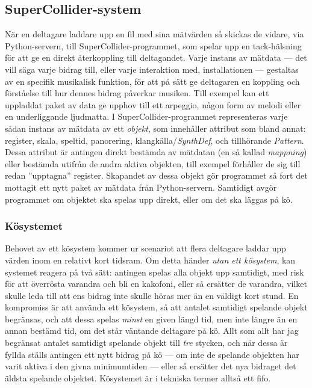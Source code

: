 \documentclass[11pt, a4paper]{article} %
\begin{document}
\subsection*{SuperCollider-system}
När en deltagare laddare upp en fil med sina mätvärden så skickas de vidare, via Python-servern, till SuperCollider-programmet, som spelar upp en tack-hälsning för att ge en direkt återkoppling till deltagandet. Varje instans av mätdata --- det vill säga varje bidrag till, eller varje interaktion med, installationen --- gestaltas av en specifik musikalisk funktion, för att på sätt ge deltagaren en koppling och förståelse till hur dennes bidrag påverkar musiken. Till exempel kan ett uppladdat paket av data ge upphov till ett arpeggio, någon form av melodi eller en underliggande ljudmatta. I SuperCollider-programmet representeras varje sådan instans av mätdata av ett \emph{objekt}, som innehåller attribut som bland annat: register, skala, speltid, panorering, klangkälla/\emph{SynthDef}, och tillhörande \emph{Pattern}. Dessa attribut är antingen direkt bestämda av mätdatan (en så kallad \emph{mappning}) eller bestämda utifrån de andra aktiva objekten, till exempel förhåller de sig till redan ''upptagna'' register. Skapandet av dessa objekt gör programmet så fort det mottagit ett nytt paket av mätdata från Python-servern. Samtidigt avgör programmet om objektet ska spelas upp direkt, eller om det ska läggas på kö. 

\subsubsection*{Kösystemet}
Behovet av ett kösystem kommer ur scenariot att flera deltagare laddar upp värden inom en relativt kort tidsram. Om detta händer \emph{utan ett kösystem}, kan systemet reagera på två sätt: antingen spelas alla objekt upp samtidigt, med risk för att överrösta varandra och bli en kakofoni, eller så ersätter de varandra, vilket skulle leda till att ens bidrag inte skulle höras mer än en väldigt kort stund. En kompromiss är att använda ett kösystem, så att antalet samtidigt spelande objekt begränsas, och att dessa spelas \emph{minst} en given längd tid, men inte längre än en annan bestämd tid, om det står väntande deltagare på kö. Allt som allt har jag begränsat antalet samtidigt spelande objekt till \emph{tre} stycken, och när dessa är fyllda ställs antingen ett nytt bidrag på kö --- om inte de spelande objekten har varit aktiva i den givna minimumtiden --- eller så ersätter det nya bidraget det äldsta spelande objektet. Kösystemet är i tekniska termer alltså ett \gls{fifo}.
\end{document}
